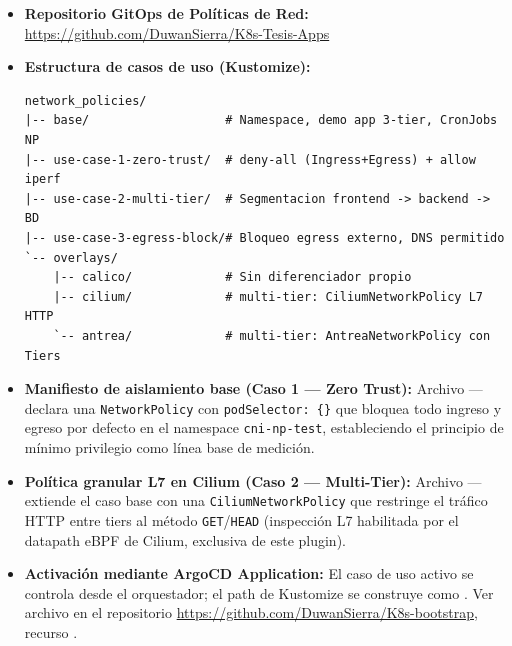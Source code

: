 \begin{itemize}
    \item \textbf{Repositorio GitOps de Políticas de Red:}
          \url{https://github.com/DuwanSierra/K8s-Tesis-Apps}

    \item \textbf{Estructura de casos de uso (Kustomize):}
\begin{verbatim}
network_policies/
|-- base/                   # Namespace, demo app 3-tier, CronJobs NP
|-- use-case-1-zero-trust/  # deny-all (Ingress+Egress) + allow iperf
|-- use-case-2-multi-tier/  # Segmentacion frontend -> backend -> BD
|-- use-case-3-egress-block/# Bloqueo egress externo, DNS permitido
`-- overlays/
    |-- calico/             # Sin diferenciador propio
    |-- cilium/             # multi-tier: CiliumNetworkPolicy L7 HTTP
    `-- antrea/             # multi-tier: AntreaNetworkPolicy con Tiers
\end{verbatim}

    \item \textbf{Manifiesto de aislamiento base (Caso 1 — Zero Trust):}
    Archivo 
    — declara una \texttt{NetworkPolicy} con \texttt{podSelector: \{\}}
    que bloquea todo ingreso y egreso por defecto en el namespace
    \texttt{cni-np-test}, estableciendo el principio de mínimo
    privilegio como línea base de medición.

    \item \textbf{Política granular L7 en Cilium (Caso 2 — Multi-Tier):}
    Archivo 
    — extiende el caso base con una \texttt{CiliumNetworkPolicy} que
    restringe el tráfico HTTP entre tiers al método
    \texttt{GET}/\texttt{HEAD} (inspección L7 habilitada por el
    datapath eBPF de Cilium, exclusiva de este plugin).

    \item \textbf{Activación mediante ArgoCD Application:}
    El caso de uso activo se controla desde el orquestador; el path
    de Kustomize se construye como
    .
    Ver archivo
     en el repositorio
    \url{https://github.com/DuwanSierra/K8s-bootstrap},
    recurso .
\end{itemize}

